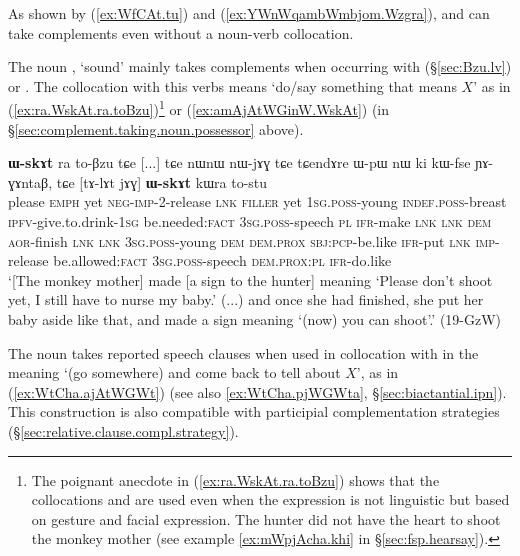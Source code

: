 As shown by (\ref{ex:WfCAt.tu}) and (\ref{ex:YWnWqambWmbjom.Wzgra}),  and  can take complements even without a noun-verb collocation. 

The noun , `sound' mainly takes complements when occurring with  (§\ref{sec:Bzu.lv}) or . The collocation with this verbs means `do/say something that means $X$' as in (\ref{ex:ra.WskAt.ra.toBzu})\footnote{The poignant anecdote in (\ref{ex:ra.WskAt.ra.toBzu}) shows that the collocations  and  are used even when the expression is not linguistic but based on gesture and facial expression. The hunter did not have the heart to shoot the monkey mother (see example \ref{ex:mWpjAcha.khi} in §\ref{sec:fsp.hearsay}). } or (\ref{ex:amAjAtWGinW.WskAt}) (in §\ref{sec:complement.taking.noun.possessor} above).

\begin{exe}
   \ex  \label{ex:ra.WskAt.ra.toBzu}
 \textbf{ɯ-skɤt} ra to-βzu tɕe [...] tɕe nɯnɯ nɯ-jɤɣ tɕe tɕendɤre ɯ-pɯ nɯ ki kɯ-fse ɲɤ-ɣɤntaβ,
tɕe [tɤ-lɤt jɤɣ] \textbf{ɯ-skɤt} kɯra to-stu \\
please \textsc{emph} yet \textsc{neg}-\textsc{imp}-2-release \textsc{lnk} \textsc{filler} yet \textsc{1sg}.\textsc{poss}-young \textsc{indef}.\textsc{poss}-breast \textsc{ipfv}-give.to.drink-\textsc{1sg} be.needed:\textsc{fact} \textsc{3sg}.\textsc{poss}-speech \textsc{pl} \textsc{ifr}-make \textsc{lnk} {  } \textsc{lnk} \textsc{dem} \textsc{aor}-finish \textsc{lnk} \textsc{lnk} \textsc{3sg}.\textsc{poss}-young \textsc{dem} \textsc{dem}.\textsc{prox} \textsc{sbj}:\textsc{pcp}-be.like \textsc{ifr}-put \textsc{lnk} \textsc{imp}-release be.allowed:\textsc{fact} \textsc{3sg}.\textsc{poss}-speech \textsc{dem}.\textsc{prox}:\textsc{pl} \textsc{ifr}-do.like \\
\glt `[The monkey mother] made [a sign to the hunter] meaning `Please don't shoot yet, I still have to nurse my baby.' (...) and once she had finished, she put her baby aside like that, and made a sign meaning `(now) you can shoot'.' (19-GzW)
\end{exe}

The noun  takes reported speech clauses when used in collocation with  in the meaning `(go somewhere) and come back to tell about $X$', as in (\ref{ex:WtCha.ajAtWGWt}) (see also \ref{ex:WtCha.pjWGWta}, §\ref{sec:biactantial.ipn}). This construction is also compatible with participial complementation strategies  (§\ref{sec:relative.clause.compl.strategy}).

